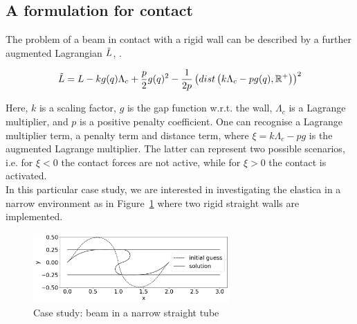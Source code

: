 \subsection{A formulation for contact}

The problem of a beam in contact with a rigid wall can be described by a further augmented Lagrangian $\Tilde{L}$, \cite{alart1991}.

\begin{equation}\label{eq:L_constraint}
    \Tilde{L} = L - k g(q) \Lambda_c + \frac{p}{2} g(q)^2 - \frac{1}{2p} \left( dist\left( k \Lambda_c - pg(q), \mathbb{R}^+ \right) \right)^2
\end{equation}

Here, $k$ is a scaling factor, $g$ is the gap function w.r.t. the wall, $\Lambda_c$ is a Lagrange multiplier, and $p$ is a positive penalty coefficient. One can recognise a Lagrange multiplier term, a penalty term and distance term, where $\xi=k \Lambda_c - pg$ is the augmented Lagrange multiplier. The latter can represent two possible scenarios, i.e. for $\xi<0$ the contact forces are not active, while for $\xi>0$ the contact is activated. \\
In this particular case study, we are interested in investigating the elastica in a narrow environment as in Figure~\ref{fig:ESR10_contact} where two rigid straight walls are implemented.

\begin{figure}[!ht]
    \centering
    \includegraphics[width=7.5cm]{figures/contact_bw.png}
    \caption{Case study: beam in a narrow straight tube}
    \label{fig:ESR10_contact}
\end{figure}





